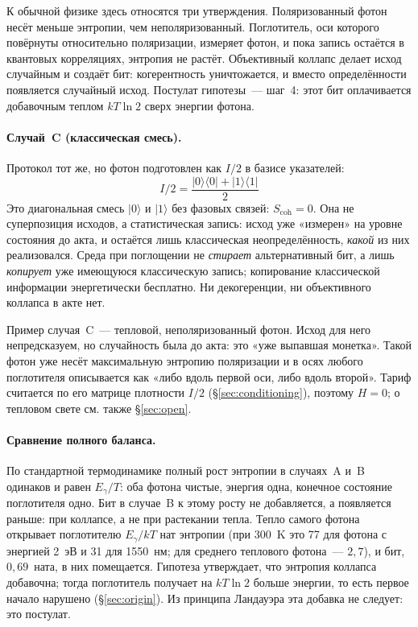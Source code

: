 \documentclass[11pt,a4paper]{article}
\newcommand{\Sref}[1]{\hyperref[#1]{\S\ref{#1}}}
\begin{document}
К обычной физике здесь относятся три утверждения. Поляризованный фотон несёт меньше энтропии, чем неполяризованный. Поглотитель, оси которого повёрнуты относительно поляризации, измеряет фотон, и пока запись остаётся в квантовых корреляциях, энтропия не растёт. Объективный коллапс делает исход случайным и создаёт бит: когерентность уничтожается, и вместо определённости появляется случайный исход. Постулат гипотезы~--- шаг~4: этот бит оплачивается добавочным теплом $kT\ln 2$ сверх энергии фотона.

\paragraph{Случай~C (классическая смесь).}
Протокол тот же, но фотон подготовлен как $I/2$ в базисе указателей:
\begin{equation}
I/2 = \frac{|0\rangle\langle 0| + |1\rangle\langle 1|}{2}
\end{equation}
Это диагональная смесь $|0\rangle$ и $|1\rangle$ без фазовых связей: $S_{\mathrm{coh}}=0$. Она не суперпозиция исходов, а статистическая запись: исход уже «измерен» на уровне состояния до акта, и остаётся лишь классическая неопределённость, \emph{какой} из них реализовался. Среда при поглощении не \emph{стирает} альтернативный бит, а лишь \emph{копирует} уже имеющуюся классическую запись; копирование классической информации энергетически бесплатно. Ни декогеренции, ни объективного коллапса в акте нет.

Пример случая~C~--- тепловой, неполяризованный фотон. Исход для него непредсказуем, но случайность была до акта: это «уже выпавшая монетка». Такой фотон уже несёт максимальную энтропию поляризации и в осях любого поглотителя описывается как «либо вдоль первой оси, либо вдоль второй». Тариф считается по его матрице плотности $I/2$ (\Sref{sec:conditioning}), поэтому $H=0$; о тепловом свете см. также \Sref{sec:open}.

\paragraph{Сравнение полного баланса.}
По стандартной термодинамике полный рост энтропии в случаях~A и~B одинаков и равен $E_\gamma/T$: оба фотона чистые, энергия одна, конечное состояние поглотителя одно. Бит в случае~B к этому росту не добавляется, а появляется раньше: при коллапсе, а не при растекании тепла. Тепло самого фотона открывает поглотителю $E_\gamma/kT$ нат энтропии (при 300~K это 77 для фотона с энергией 2~эВ и 31 для 1550~нм; для среднего теплового фотона~--- $2{,}7$), и бит, $0{,}69$~ната, в них помещается. Гипотеза утверждает, что энтропия коллапса добавочна; тогда поглотитель получает на $kT\ln 2$ больше энергии, то есть первое начало нарушено (\Sref{sec:origin}). Из принципа Ландауэра эта добавка не следует: это постулат.
\end{document}

